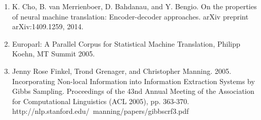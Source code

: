 \documentclass[letterpaper, 10pt]{article}
\begin{document}
\begin{multicols}{2}
\begin{enumerate}
\item K. Cho, B. van Merrienboer, D. Bahdanau, and Y. Bengio. On the properties of neural machine translation: Encoder-decoder approaches. arXiv preprint arXiv:1409.1259, 2014.

\item Europarl: A Parallel Corpus for Statistical Machine Translation, Philipp Koehn, MT Summit 2005.

\item Jenny Rose Finkel, Trond Grenager, and Christopher Manning. 2005. Incorporating Non-local Information into Information Extraction Systems by Gibbs Sampling. Proceedings of the 43nd Annual Meeting of the Association for Computational Linguistics (ACL 2005), pp. 363-370. http://nlp.stanford.edu/~manning/papers/gibbscrf3.pdf
\end{enumerate}

\end{multicols}
\end{document}
